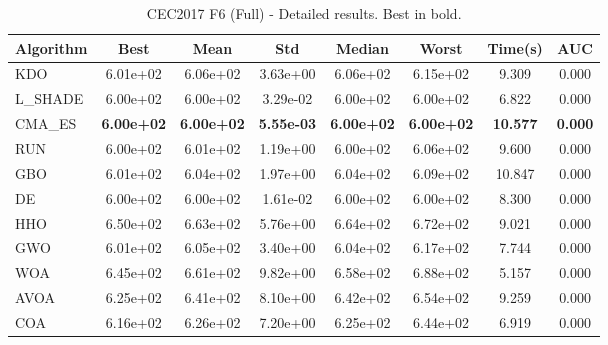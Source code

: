 \begin{table}[H]
\centering\small
\caption{CEC2017 F6 (Full) - Detailed results. Best in bold.}
\label{tab:cec2017_F6}
\begin{tabular}{lccccccc}
\toprule
\textbf{Algorithm} & \textbf{Best} & \textbf{Mean} & \textbf{Std} & \textbf{Median} & \textbf{Worst} & \textbf{Time(s)} & \textbf{AUC} \\
\midrule
KDO & 6.01e+02 & 6.06e+02 & 3.63e+00 & 6.06e+02 & 6.15e+02 & 9.309 & 0.000 \\
L_SHADE & 6.00e+02 & 6.00e+02 & 3.29e-02 & 6.00e+02 & 6.00e+02 & 6.822 & 0.000 \\
CMA_ES & \textbf{6.00e+02} & \textbf{6.00e+02} & \textbf{5.55e-03} & \textbf{6.00e+02} & \textbf{6.00e+02} & \textbf{10.577} & \textbf{0.000} \\
RUN & 6.00e+02 & 6.01e+02 & 1.19e+00 & 6.00e+02 & 6.06e+02 & 9.600 & 0.000 \\
GBO & 6.01e+02 & 6.04e+02 & 1.97e+00 & 6.04e+02 & 6.09e+02 & 10.847 & 0.000 \\
DE & 6.00e+02 & 6.00e+02 & 1.61e-02 & 6.00e+02 & 6.00e+02 & 8.300 & 0.000 \\
HHO & 6.50e+02 & 6.63e+02 & 5.76e+00 & 6.64e+02 & 6.72e+02 & 9.021 & 0.000 \\
GWO & 6.01e+02 & 6.05e+02 & 3.40e+00 & 6.04e+02 & 6.17e+02 & 7.744 & 0.000 \\
WOA & 6.45e+02 & 6.61e+02 & 9.82e+00 & 6.58e+02 & 6.88e+02 & 5.157 & 0.000 \\
AVOA & 6.25e+02 & 6.41e+02 & 8.10e+00 & 6.42e+02 & 6.54e+02 & 9.259 & 0.000 \\
COA & 6.16e+02 & 6.26e+02 & 7.20e+00 & 6.25e+02 & 6.44e+02 & 6.919 & 0.000 \\
\bottomrule
\end{tabular}
\end{table}
